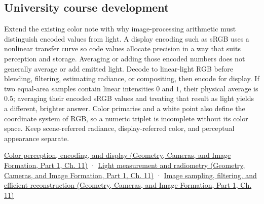 \subsection{University course development}\label{appendix-a9f83ad40792-university-course-development}

\hypertarget{appendix-a9f83ad40792-university-course-development}{}

Extend the existing color note with why image-processing arithmetic must distinguish encoded values from light. A display encoding such as sRGB uses a nonlinear transfer curve so code values allocate precision in a way that suits perception and storage. Averaging or adding those encoded numbers does not generally average or add emitted light. Decode to linear-light RGB before blending, filtering, estimating radiance, or compositing, then encode for display. If two equal-area samples contain linear intensities \(0\) and \(1\), their physical average is \(0.5\); averaging their encoded sRGB values and treating that result as light yields a different, brighter answer. Color primaries and a white point also define the coordinate system of RGB, so a numeric triplet is incomplete without its color space. Keep scene-referred radiance, display-referred color, and perceptual appearance separate.

\href{../03-Geometry-Cameras-and-Image-Formation-P01/main.pdf\#03-visual-computing-i-ch004-color-perception-encoding-and-display}{Color perception, encoding, and display (Geometry, Cameras, and Image Formation, Part 1, Ch. 11)} · \href{../03-Geometry-Cameras-and-Image-Formation-P01/main.pdf\#03-visual-computing-i-ch004-light-measurement-and-radiometry}{Light measurement and radiometry (Geometry, Cameras, and Image Formation, Part 1, Ch. 11)} · \href{../03-Geometry-Cameras-and-Image-Formation-P01/main.pdf\#03-visual-computing-i-ch004-image-sampling-filtering-and-efficient-reconstruction}{Image sampling, filtering, and efficient reconstruction (Geometry, Cameras, and Image Formation, Part 1, Ch. 11)}
